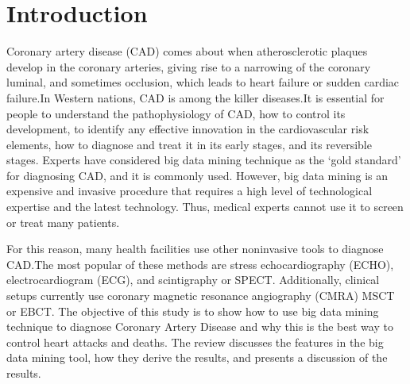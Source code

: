 
\maketitle

\section{Introduction}

Coronary artery disease (CAD) comes about when atherosclerotic plaques
develop in the coronary arteries, giving rise to a narrowing of the
coronary luminal, and sometimes occlusion, which leads to heart
failure or sudden cardiac failure.In Western nations, CAD is among the
killer diseases.It is essential for people to understand the
pathophysiology of CAD, how to control its development, to identify
any effective innovation in the cardiovascular risk elements, how to
diagnose and treat it in its early stages, and its reversible stages.
Experts have considered big data mining technique as the `gold
standard' for diagnosing CAD, and it is commonly used. However, big
data mining is an expensive and invasive procedure that 
requires a high level of technological expertise and the latest
technology. Thus, medical experts cannot use it to screen or treat
many patients. 
\par For this reason, many health facilities use other noninvasive
tools to diagnose CAD.The most popular of these methods are stress
echocardiography (ECHO), electrocardiogram (ECG), and scintigraphy or
SPECT. Additionally, clinical setups currently use coronary magnetic
resonance angiography (CMRA) MSCT or EBCT. The objective of this study
is to show how to use big data mining technique to diagnose Coronary
Artery Disease and why this is the best way to control heart attacks
and deaths. The review discusses the features in the big data mining
tool, how they derive the results, and presents a discussion of the
results.

